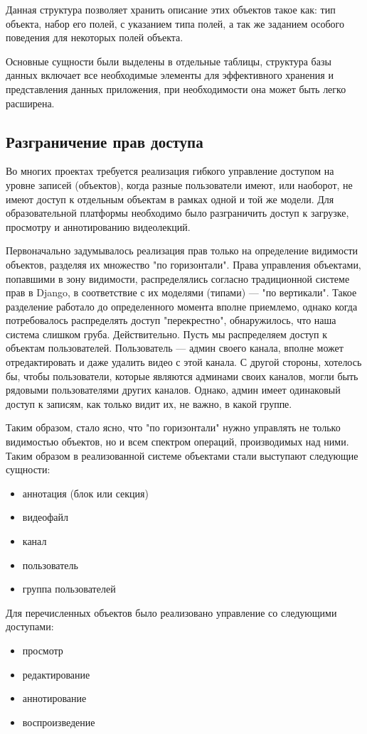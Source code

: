 Данная структура позволяет хранить описание этих объектов такое как: тип объекта,
набор его полей, с указанием типа полей, а так же заданием особого поведения для
некоторых полей объекта.

Основные сущности были выделены в отдельные таблицы, структура базы данных включает
все необходимые элементы для эффективного хранения и представления данных приложения,
при необходимости она может быть легко расширена.

\subsection{Разграничение прав доступа}

Во многих проектах требуется реализация гибкого управление доступом на уровне записей (объектов), когда разные
пользователи имеют, или наоборот, не имеют доступ к отдельным объектам в рамках одной и той же модели. Для образовательной
платформы необходимо было разграничить доступ к загрузке, просмотру и аннотированию видеолекций.

Первоначально задумывалось реализация прав только на определение видимости объектов, разделяя их множество "по горизонтали".
Права управления объектами, попавшими в зону видимости, распределялись согласно традиционной системе прав в Django,
в соответствие с их моделями (типами) — "по вертикали". Такое разделение работало до определенного момента вполне приемлемо,
однако когда потребовалось распределять доступ "перекрестно", обнаружилось, что наша система слишком груба.
Действительно. Пусть мы распределяем доступ к объектам пользователей. Пользователь — админ своего канала, вполне может
отредактировать и даже удалить видео с этой канала. С другой стороны, хотелось бы, чтобы пользователи, которые являются
админами своих каналов, могли быть рядовыми пользователями других каналов. Однако, админ имеет одинаковый доступ к записям,
как только видит их, не важно, в какой группе.

Таким образом, стало ясно, что "по горизонтали" нужно управлять не только видимостью объектов, но и всем спектром операций,
производимых над ними. Таким образом в реализованной системе объектами стали выступают следующие сущности:
\begin{itemize}[wide,topsep=0pt]
  \itemsep0em
  \item аннотация (блок или секция)
  \item видеофайл
  \item канал
  \item пользователь
  \item группа пользователей
\end{itemize}
Для перечисленных объектов было реализовано управление со следующими доступами:
\begin{itemize}[wide,topsep=0pt]
  \itemsep0em
  \item просмотр
  \item редактирование
  \item аннотирование
  \item воспроизведение
\end{itemize}

